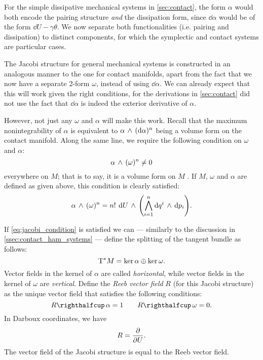 For the simple dissipative mechanical systems in \cref{sec:contact}, the form \(\alpha\) would both encode the pairing structure \emph{and} the dissipation form, since \(\dd{\alpha}\) would be of the form \(\dd{U} - \gamma \theta\).  We now separate both functionalities (i.e. pairing and dissipation) to distinct components, for which the symplectic and contact systems are particular cases.

The Jacobi structure for general mechanical systems is constructed in an analogous manner to the one for contact manifolds, apart from the fact that we now have a separate 2-form \(\omega\), instead of using \(\dd{\alpha}\). We can already expect that this will work given the right conditions, for the derivations in \cref{sec:contact} did not use the fact that \(\dd{\alpha}\) is indeed the exterior derivative of \(\alpha\). 

However, not just any \(\omega\) and \(\alpha\) will make this work. Recall that the maximum nonintegrability of \(\alpha\) is equivalent to \( \alpha\,\wedge\,(\dd{\alpha})^n \) being a volume form on the contact manifold. Along the same line, we require the following condition on \(\omega\) and \(\alpha\):
\begin{equation}
     \alpha\,\wedge\,(\omega)^n  \neq 0
    \label{eq:jacobi_condition}
\end{equation}
everywhere on \(M\); that is to say, it is a volume form on \(M\) \cite{ciaglia2018}. If \(M\), \(\omega\) and \(\alpha\) are defined as given above, this condition is clearly satisfied:
\begin{equation}
      \alpha\,\wedge\,(\omega)^n  = n!\: \dd{U}\,\wedge\,\qty(\bigwedge_{i=1}^{n} \dd{q^i}\,\wedge\,\dd{p_i} ) .
\end{equation}

If \cref{eq:jacobi_condition} is satisfied we can --- similarly to the discussion in \cref{ssec:contact_ham_systems} --- define the splitting of the tangent bundle as follows:
\begin{equation}
     \mathrm{T}^*M = \ker{\alpha}\oplus\ker{\omega}.
\end{equation}
Vector fields in the kernel of \(\alpha\) are called \emph{horizontal}, while vector fields in the kernel of \(\omega\) are \emph{vertical}. Define the \emph{Reeb vector field} \(R\) (for this Jacobi structure) as the unique vector field that satisfies the following conditions:
\begin{equation}
     \intpr{R}{\alpha} = 1 \qquad \intpr{R}{\omega} = 0.
\end{equation}
In Darboux coordinates, we have
\begin{equation}
     R = \pdv{}{U}.
\end{equation}
The vector field of the Jacobi structure is equal to the Reeb vector field.

